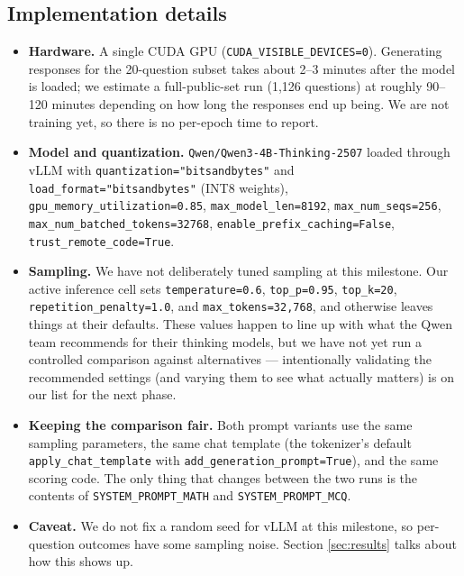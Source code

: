\documentclass{article}
\begin{document}
\subsection{Implementation details}
\label{sec:implementation_details}
\begin{itemize}
    \item \textbf{Hardware.} A single CUDA GPU
    (\texttt{CUDA\_VISIBLE\_DEVICES=0}). Generating responses for
    the 20-question subset takes about 2--3 minutes after the model
    is loaded; we estimate a full-public-set run (1{,}126 questions)
    at roughly 90--120 minutes depending on how long the responses
    end up being. We are not training yet, so there is no per-epoch
    time to report.
    \item \textbf{Model and quantization.} \texttt{Qwen/Qwen3-4B-Thinking-2507}
    loaded through vLLM with \texttt{quantization="bitsandbytes"} and
    \texttt{load\_format="bitsandbytes"} (INT8 weights),
    \texttt{gpu\_memory\_utilization=0.85},
    \texttt{max\_model\_len=8192},
    \texttt{max\_num\_seqs=256},
    \texttt{max\_num\_batched\_tokens=32768},
    \texttt{enable\_prefix\_caching=False},
    \texttt{trust\_remote\_code=True}.
    \item \textbf{Sampling.} We have not deliberately tuned sampling
    at this milestone. Our active inference cell sets
    \texttt{temperature=0.6}, \texttt{top\_p=0.95}, \texttt{top\_k=20},
    \texttt{repetition\_penalty=1.0}, and \texttt{max\_tokens=32{,}768},
    and otherwise leaves things at their defaults. These values
    happen to line up with what the Qwen team recommends for their
    thinking models, but we have not yet run a controlled comparison
    against alternatives --- intentionally validating the
    recommended settings (and varying them to see what actually
    matters) is on our list for the next phase.
    \item \textbf{Keeping the comparison fair.} Both prompt variants
    use the same sampling parameters, the same chat template (the
    tokenizer's default \texttt{apply\_chat\_template} with
    \texttt{add\_generation\_prompt=True}), and the same scoring
    code. The only thing that changes between the two runs is the
    contents of \texttt{SYSTEM\_PROMPT\_MATH} and
    \texttt{SYSTEM\_PROMPT\_MCQ}.
    \item \textbf{Caveat.} We do not fix a random seed for vLLM at
    this milestone, so per-question outcomes have some sampling
    noise. Section \ref{sec:results} talks about how this shows up.
\end{itemize}
\end{document}
